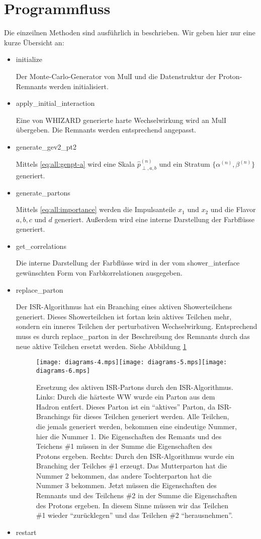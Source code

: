 \section{Programmfluss}
Die einzeilnen Methoden sind ausführlich in  beschrieben. Wir geben hier nur eine kurze Übersicht an:
\begin{itemize}
\item initialize

  Der Monte-Carlo-Generator von MulI und die Datenstruktur der Proton-Remnants werden initialisiert.
\item apply\_initial\_interaction

  Eine von WHIZARD generierte harte Wechselwirkung wird an MulI übergeben. Die Remnants werden entsprechend angepasst.
\item generate\_gev2\_pt2
  
  Mittels \eqref{eq:all:genpt-a} wird eine Skala $\widehat{p}_{\perp,a,b}^{(n)}$ und ein Stratum $\{\alpha^{(n)},\beta^{(n)}\}$ generiert.
\item generate\_partons
  
  Mittels \eqref{eq:all:importance} werden die Impulsanteile $x_1$ und $x_2$ und die Flavor $a,b,c$ und $d$ generiert. Außerdem wird eine interne Darstellung der Farbflüsse generiert.
\item get\_correlations

Die interne Darstellung der Farbflüsse wird in der vom shower\_interface gewünschten Form von Farbkorrelationen ausgegeben.
\item replace\_parton

  Der ISR-Algorithmus hat ein Branching eines aktiven Showerteilchens generiert. Dieses Showerteilchen ist fortan kein aktives Teilchen mehr, sondern ein inneres Teilchen der perturbativen Wechselwirkung. Entsprechend muss es durch replace\_parton in der Beschreibung des Remnants durch das neue aktive Teilchen ersetzt werden. Siehe Abbildung \ref{fig:all:flow:isr}
  \begin{figure}
    \begin{center}
      \texttt{[image: diagrams-4.mps]}\texttt{[image: diagrams-5.mps]}\texttt{[image: diagrams-6.mps]}
      \caption{\label{fig:all:flow:isr}Ersetzung des aktiven ISR-Partons durch den ISR-Algorithmus. Links: Durch die härteste WW wurde ein Parton aus dem Hadron entfert. Dieses Parton ist ein "`aktives"' Parton, da ISR-Branchings für dieses Teilchen generiert werden. Alle Teilchen, die jemals generiert werden, bekommen eine eindeutige Nummer, hier die Nummer 1. Die Eigenschaften des Remants und des Teichens \#1 müssen in der Summe die Eigenschaften des Protons ergeben. Rechts: Durch den ISR-Algorithmus wurde ein Branching der Teilches \#1 erzeugt. Das Mutterparton hat die Nummer 2 bekommen, das andere Tochterparton hat die Nummer 3 bekommen. Jetzt müssen die Eigenschaften des Remnants und des Teilchens \#2 in der Summe die Eigenschaften des Protons ergeben. In diesem Sinne müssen wir das Teilchen \#1 wieder "`zurücklegen"' und das Teilchen \#2 "`herausnehmen"'.}
    \end{center}
  \end{figure}
\item restart


\end{itemize}
